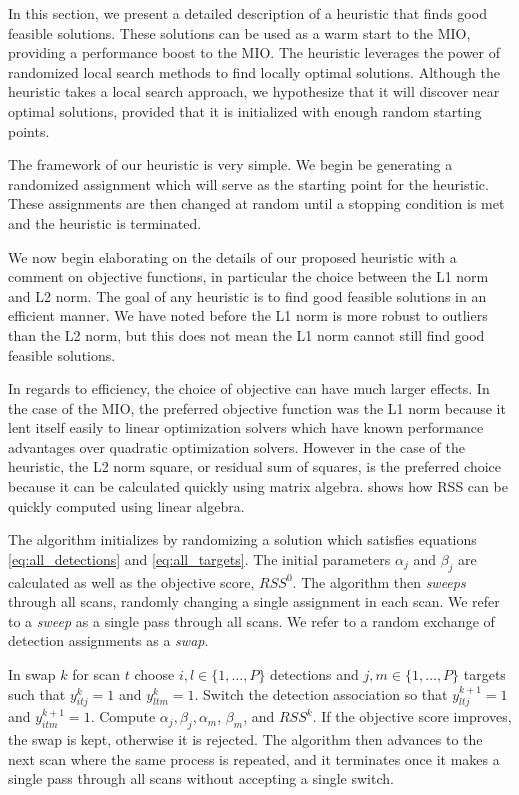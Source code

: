 In this section, we present a detailed description of a heuristic that finds good feasible solutions. These solutions can be used as a warm start to the MIO, providing a performance boost to the MIO. The heuristic leverages the power of randomized local search methods to find locally optimal solutions. Although the heuristic takes a local search approach, we hypothesize that it will discover near optimal solutions, provided that it is initialized with enough random starting points. 

The framework of our heuristic is very simple. We begin be generating a randomized assignment which will serve as the starting point for the heuristic. These assignments are then changed at random until a stopping condition is met and the heuristic is terminated. 

We now begin elaborating on the details of our proposed heuristic with a comment on objective functions, in particular the choice between the L1 norm and L2 norm. The goal of any heuristic is to find good feasible solutions in an efficient manner. We have noted before the L1 norm is more robust to outliers than the L2 norm, but this does not mean the L1 norm cannot still find good feasible solutions. 

In regards to efficiency, the choice of objective can have much larger effects. In the case of the MIO, the preferred objective function was the L1 norm because it lent itself easily to linear optimization solvers which have known performance advantages over quadratic optimization solvers. However in the case of the heuristic, the L2 norm square, or residual sum of squares, is the preferred choice because it can be calculated quickly using matrix algebra. \cite{RSS-Matrix} shows how RSS can be quickly computed using linear algebra.

The algorithm initializes by randomizing a solution which satisfies equations \eqref{eq:all_detections} and \eqref{eq:all_targets}. The initial parameters $\alpha_{j}$ and $\beta_{j}$ are calculated as well as the objective score, $RSS^{0}$. The algorithm then \textit{sweeps} through all scans, randomly changing a single assignment in each scan. We refer to a \textit{sweep} as a single pass through all scans. We refer to a random exchange of detection assignments as a \textit{swap}.

In swap $k$ for scan $t$ choose $i,l\in \{1,\ldots,P\}$ detections and $j,m\in\{1,\ldots,P\}$ targets such that $y^k_{itj}=1$ and $y^k_{ltm}=1$. Switch the detection association so that $y^{k+1}_{ltj}=1$ and $y^{k+1}_{itm}=1$. Compute $\alpha_{j}, \beta_{j}, \alpha_{m}$, $\beta_{m}$, and $RSS^{k}$. If the objective score improves, the swap is kept, otherwise it is rejected. The algorithm then advances to the next scan where the same process is repeated, and it terminates once it makes a single pass through all scans without accepting a single switch. 

